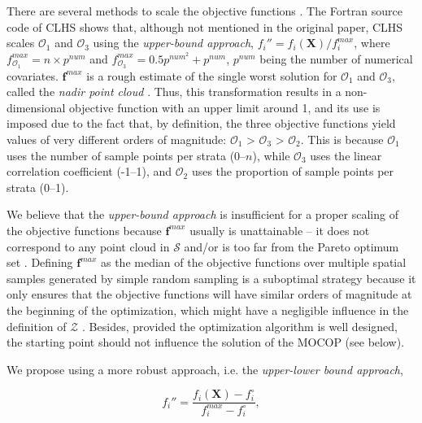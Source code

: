 There are several methods to scale the objective functions \cite{MarlerEtAl2005}. The Fortran source code of 
CLHS shows that, although not mentioned in the original paper, CLHS scales $\mathcal{O}_1$ and $\mathcal{O}_3$ 
using the \emph{upper-bound approach}, $f_i'' =f_i(\boldsymbol{X}) / f_i^{max}$, where $f^{max}_{\mathcal{O}_1} 
= n \times p^{num}$ and $f^{max}_{\mathcal{O}_3} = 0.5p^{num^2} + p^{num}$, $p^{num}$ being the number of 
numerical covariates. $\boldsymbol{f}^{max}$ is a rough estimate of the single worst solution for 
$\mathcal{O}_1$ and $\mathcal{O}_3$, called the \emph{nadir point cloud} \cite{MarlerEtAl2004}. Thus, this 
transformation results in a non-dimensional objective function with an upper limit around 1, and its use is 
imposed due to the fact that, by definition, the three objective functions yield values of very different 
orders of magnitude: $\mathcal{O}_1$ > $\mathcal{O}_3$ > $\mathcal{O}_2$. This is because $\mathcal{O}_1$ uses 
the number of sample points per strata (0--$n$), while $\mathcal{O}_3$ uses the linear correlation coefficient 
(-1--1), and $\mathcal{O}_2$ uses the proportion of sample points per strata (0--1).

We believe that the \emph{upper-bound approach} is insufficient for a proper scaling of the objective functions 
because $\boldsymbol{f}^{max}$ usually is unattainable -- it does not correspond to any point cloud in 
$\mathcal{S}$ and/or is too far from the Pareto optimum set \cite{MarlerEtAl2004}. Defining 
$\boldsymbol{f}^{max}$ as the median of the objective functions over multiple spatial samples generated by 
simple random sampling \cite{CliffordEtAl2014} is a suboptimal strategy because it only ensures that the 
objective functions will have similar orders of magnitude at the beginning of the optimization, which might 
have a negligible influence in the definition of $\mathcal{Z}$ \cite{MarlerEtAl2005}. Besides, provided the 
optimization algorithm is well designed, the starting point should not influence the solution of the MOCOP (see 
below).

We propose using a more robust approach, i.e. the \emph{upper-lower bound approach},

\begin{equation}\label{eqn:chap08-pareto-min-max}
 f_i'' = \frac{f_i(\boldsymbol{X}) - f_i^{\circ}}{f_i^{max} - f_i^{\circ}},
\end{equation}\label{eqn:chap08-pareto-min-max}


